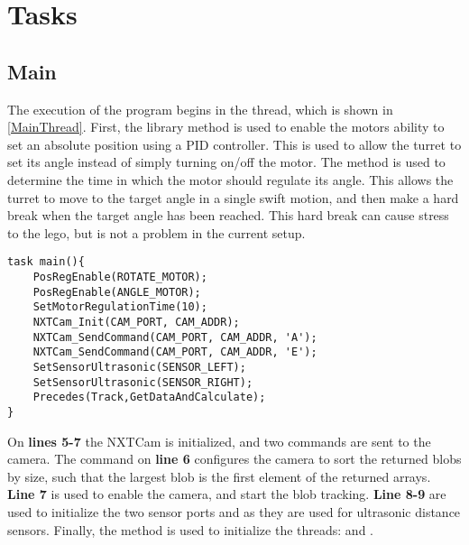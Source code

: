 \section{Tasks}


\subsection{Main}
The execution of the program begins in the  thread, which is shown
in \autoref{MainThread}. First, the library method
 is used to enable the motors ability to set
an absolute position using a PID controller. This is used to allow the turret to set its angle instead of simply turning on/off the motor.
The  method is used to determine the
time in which the motor should regulate its angle. This allows the turret to
move to the target angle in a single swift motion, and then make a hard break
when the target angle has been reached. This hard break can cause stress to the
lego, but is not a problem in the current setup.

\begin{minipage}[H]{\linewidth}
\begin{lstlisting}[caption = Entry point for the program execution., label = MainThread] 
task main(){
    PosRegEnable(ROTATE_MOTOR);
    PosRegEnable(ANGLE_MOTOR);
    SetMotorRegulationTime(10);
    NXTCam_Init(CAM_PORT, CAM_ADDR);
    NXTCam_SendCommand(CAM_PORT, CAM_ADDR, 'A');
    NXTCam_SendCommand(CAM_PORT, CAM_ADDR, 'E');
    SetSensorUltrasonic(SENSOR_LEFT);
    SetSensorUltrasonic(SENSOR_RIGHT);
    Precedes(Track,GetDataAndCalculate);
}
\end{lstlisting}
\end{minipage}

On \textbf{lines 5-7} the NXTCam is initialized, and two commands are
sent to the camera. The command on \textbf{line 6} configures the camera
to sort the returned blobs by size, such that the largest blob is the first
element of the returned arrays. \textbf{Line 7} is used to enable the camera,
and start the blob tracking. \textbf{Line 8-9} are used to
initialize the two sensor ports  and
 as they are used for ultrasonic distance sensors.
Finally, the  method is used to initialize the
threads:  and .
